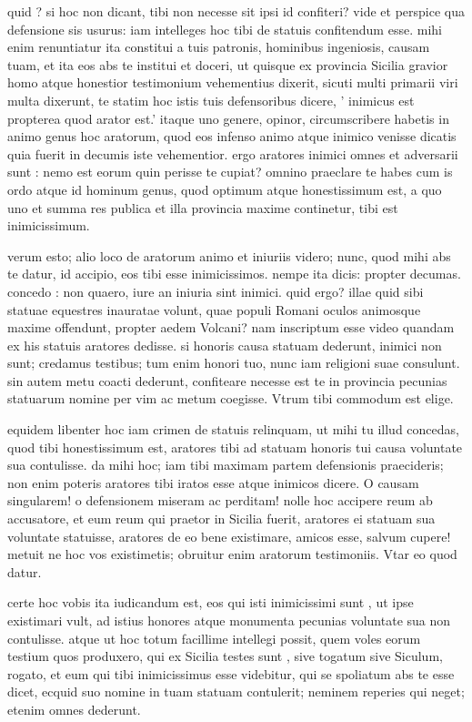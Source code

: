  quid ? si hoc non dicant, tibi non necesse sit ipsi id confiteri? vide et perspice qua defensione sis usurus: iam intelleges hoc tibi de statuis confitendum esse. mihi enim renuntiatur ita constitui a tuis patronis, hominibus ingeniosis, causam tuam, et ita eos abs te institui et doceri, ut quisque ex provincia Sicilia gravior homo atque honestior testimonium vehementius dixerit, sicuti multi primarii viri multa dixerunt, te statim hoc istis tuis defensoribus dicere, ' inimicus est propterea quod arator est.' itaque uno genere, opinor, circumscribere habetis in animo genus hoc aratorum, quod eos infenso animo atque inimico venisse dicatis quia fuerit in decumis iste vehementior. ergo aratores inimici omnes et adversarii sunt : nemo est eorum quin perisse te cupiat? omnino praeclare te habes cum is ordo atque id hominum genus, quod optimum atque honestissimum est, a quo uno et summa res publica et illa provincia maxime continetur, tibi est inimicissimum.

 verum esto; alio loco de aratorum animo et iniuriis videro; nunc, quod mihi abs te datur, id accipio, eos tibi esse inimicissimos. nempe ita dicis: propter decumas. concedo : non quaero, iure an iniuria sint inimici. quid ergo? illae quid sibi statuae equestres inauratae volunt, quae populi Romani oculos animosque maxime offendunt, propter aedem Volcani? nam inscriptum esse video quandam ex his statuis aratores dedisse. si honoris causa statuam dederunt, inimici non sunt; credamus testibus; tum enim honori tuo, nunc iam religioni suae consulunt. sin autem metu coacti dederunt, confiteare necesse est te in provincia pecunias statuarum nomine per vim ac metum coegisse. Vtrum tibi commodum est elige.

 equidem libenter hoc iam crimen de statuis relinquam, ut mihi tu illud concedas, quod tibi honestissimum est, aratores tibi ad statuam honoris tui causa voluntate sua contulisse. da mihi hoc; iam tibi maximam partem defensionis praecideris; non enim poteris aratores tibi iratos esse atque inimicos dicere. O causam singularem! o defensionem miseram ac perditam! nolle hoc accipere reum ab accusatore, et eum reum qui praetor in Sicilia fuerit, aratores ei statuam sua voluntate statuisse, aratores de eo bene existimare, amicos esse, salvum cupere! metuit ne hoc vos existimetis; obruitur enim aratorum testimoniis. Vtar eo quod datur.

 certe hoc vobis ita iudicandum est, eos qui isti inimicissimi sunt , ut ipse existimari vult, ad istius honores atque monumenta pecunias voluntate sua non contulisse. atque ut hoc totum facillime intellegi possit, quem voles eorum testium quos produxero, qui ex Sicilia testes sunt , sive togatum sive Siculum, rogato, et eum qui tibi inimicissimus esse videbitur, qui se spoliatum abs te esse dicet, ecquid suo nomine in tuam statuam contulerit; neminem reperies qui neget; etenim omnes dederunt.

